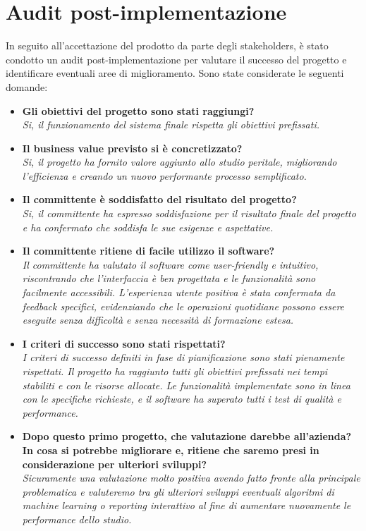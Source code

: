 \documentclass[a4paper,12pt, openright]{report}
\begin{document}
\section{Audit post-implementazione}
In seguito all'accettazione del prodotto da parte degli stakeholders, è stato condotto un audit post-implementazione per valutare il successo del progetto e identificare eventuali aree di miglioramento. Sono state considerate le seguenti domande:
\begin{itemize}
    \item \textbf{Gli obiettivi del progetto sono stati raggiungi?} \\
    \textit{Si, il funzionamento del sistema finale rispetta gli obiettivi prefissati.}
    \item \textbf{Il business value previsto si è concretizzato?}\\
    \textit{Si, il progetto ha fornito valore aggiunto allo studio peritale, migliorando l'efficienza e creando un nuovo performante processo semplificato.}
    \item \textbf{Il committente è soddisfatto del risultato del progetto?} \\
    \textit{Si, il committente ha espresso soddisfazione per il risultato finale del progetto e ha confermato che soddisfa le sue esigenze e aspettative.}
    \item \textbf{Il committente ritiene di facile utilizzo il software?}\\
    \textit{Il committente ha valutato il software come user-friendly e intuitivo, riscontrando che l'interfaccia è ben progettata e le funzionalità sono facilmente accessibili. L’esperienza utente positiva è stata confermata da feedback specifici, evidenziando che le operazioni quotidiane possono essere eseguite senza difficoltà e senza necessità di formazione estesa.}
    \item \textbf{I criteri di successo sono stati rispettati?}\\
    \textit{I criteri di successo definiti in fase di pianificazione sono stati pienamente rispettati. Il progetto ha raggiunto tutti gli obiettivi prefissati nei tempi stabiliti e con le risorse allocate. Le funzionalità implementate sono in linea con le specifiche richieste, e il software ha superato tutti i test di qualità e performance.}
    \item \textbf{Dopo questo primo progetto, che valutazione darebbe all'azienda? In cosa si potrebbe migliorare e, ritiene che saremo presi in considerazione per ulteriori sviluppi? }\\
    \textit{Sicuramente una valutazione molto positiva avendo fatto fronte alla principale problematica e valuteremo tra gli ulteriori sviluppi eventuali algoritmi di machine learning o reporting interattivo al fine di aumentare nuovamente le performance dello studio.}


\end{itemize}
\end{document}
